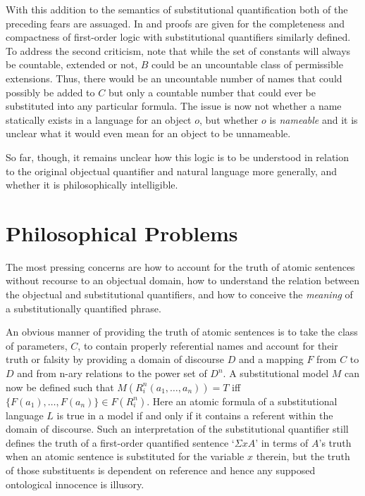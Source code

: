 \documentclass[12pt,letterpaper]{article}
\begin{document}
\begin{doublespace}
With this addition to the semantics of substitutional quantification
both of the preceding fears are assuaged.  In \cite{bonevac84} and
\cite{dunn} proofs are given for the completeness and compactness of
first-order logic with substitutional quantifiers similarly defined.
To address the second criticism, note that while the set of constants
will always be countable, extended or not, $B$ could be an uncountable
class of permissible extensions.  Thus, there would be an uncountable
number of names that could possibly be added to $C$ but only a
countable number that could ever be substituted into any particular
formula.  The issue is now not whether a name statically exists in a
language for an object $o$, but whether $o$ is \emph{nameable} and it
is unclear what it would even mean for an object to be unnameable.

So far, though, it remains unclear how this logic is to be understood
in relation to the original objectual quantifier and natural language
more generally, and whether it is philosophically intelligible.


\section{Philosophical Problems}

The most pressing concerns are how to account for the truth of atomic
sentences without recourse to an objectual domain, how to understand
the relation between the objectual and substitutional quantifiers, and
how to conceive the \emph{meaning} of a substitutionally quantified
phrase.

An obvious manner of providing the truth of atomic sentences is to
take the class of parameters, $C$, to contain properly referential
names and account for their truth or falsity by providing a domain of
discourse $D$ and a mapping $F$ from $C$ to $D$ and from n-ary
relations to the power set of $D^n$. A substitutional model $M$ can
now be defined such that $M(R^n_i(a_1, \ldots, a_n)) = T$ iff $\{F(a_1),
\ldots, F(a_n)\} \in F(R^n_i)$.  Here an atomic formula of a
substitutional language $L$ is true in a model if and only if it
contains a referent within the domain of discourse.  Such an
interpretation of the substitutional quantifier still defines the
truth of a first-order quantified sentence `$\Sigma xA$' in terms of
$A$'s truth when an atomic sentence is substituted for the variable
$x$ therein, but the truth of those substituents is dependent on
reference and hence any supposed ontological innocence is illusory.


\end{doublespace}
\end{document}
